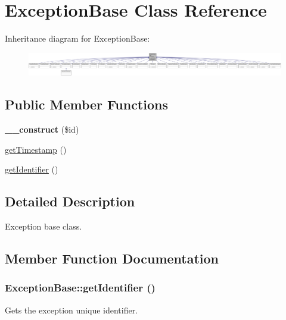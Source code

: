 \hypertarget{classExceptionBase}{
\section{ExceptionBase Class Reference}
\label{classExceptionBase}
}


Inheritance diagram for ExceptionBase:\nopagebreak
\begin{figure}[H]
\begin{center}
\leavevmode
\includegraphics[width=400pt]{classExceptionBase__inherit__graph}
\end{center}
\end{figure}
\subsection*{Public Member Functions}
\begin{DoxyCompactItemize}
\item 
\hypertarget{classExceptionBase_a05cf03ef3e2ae6b44c03b15c6b63f687}{
{\bfseries \_\-\_\-construct} (\$id)}
\label{classExceptionBase_a05cf03ef3e2ae6b44c03b15c6b63f687}

\item 
\hyperlink{classExceptionBase_a08d8c6269e0157deb4e90aa4353a7bb5}{getTimestamp} ()
\item 
\hyperlink{classExceptionBase_a6b77bfa3146af5a093587f43987e9167}{getIdentifier} ()
\end{DoxyCompactItemize}


\subsection{Detailed Description}
Exception base class. 

\subsection{Member Function Documentation}
\hypertarget{classExceptionBase_a6b77bfa3146af5a093587f43987e9167}{
\subsubsection[{getIdentifier}]{\setlength{\rightskip}{0pt plus 5cm}ExceptionBase::getIdentifier ()}}
\label{classExceptionBase_a6b77bfa3146af5a093587f43987e9167}
Gets the exception unique identifier.

